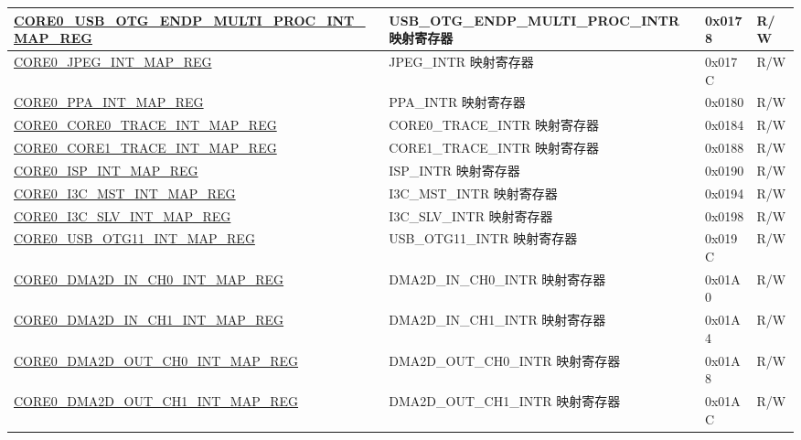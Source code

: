 \begin{longtable}{ | p{8.7cm} | p{6.2cm} | p{1.3cm} | p{1cm} | }
\hyperref[regdesc:CORE0USBOTGENDPMULTIPROCINTMAPREG]{CORE0\_USB\_OTG\_ENDP\_MULTI\_PROC\_INT\_MAP\_REG} & USB\_OTG\_ENDP\_MULTI\_PROC\_INTR 映射寄存器 & 0x0178 & R/W \\ \hline

\hyperref[regdesc:CORE0JPEGINTMAPREG]{CORE0\_JPEG\_INT\_MAP\_REG} & JPEG\_INTR 映射寄存器 & 0x017C & R/W \\ \hline

\hyperref[regdesc:CORE0PPAINTMAPREG]{CORE0\_PPA\_INT\_MAP\_REG} & PPA\_INTR 映射寄存器 & 0x0180 & R/W \\ \hline

\hyperref[regdesc:CORE0CORE0TRACEINTMAPREG]{CORE0\_CORE0\_TRACE\_INT\_MAP\_REG} & CORE0\_TRACE\_INTR 映射寄存器 & 0x0184 & R/W \\ \hline

\hyperref[regdesc:CORE0CORE1TRACEINTMAPREG]{CORE0\_CORE1\_TRACE\_INT\_MAP\_REG} & CORE1\_TRACE\_INTR 映射寄存器 & 0x0188 & R/W \\ \hline

\hyperref[regdesc:CORE0ISPINTMAPREG]{CORE0\_ISP\_INT\_MAP\_REG} & ISP\_INTR 映射寄存器 & 0x0190 & R/W \\ \hline

\hyperref[regdesc:CORE0I3CMSTINTMAPREG]{CORE0\_I3C\_MST\_INT\_MAP\_REG} & I3C\_MST\_INTR 映射寄存器 & 0x0194 & R/W \\ \hline

\hyperref[regdesc:CORE0I3CSLVINTMAPREG]{CORE0\_I3C\_SLV\_INT\_MAP\_REG} & I3C\_SLV\_INTR 映射寄存器 & 0x0198 & R/W \\ \hline

\hyperref[regdesc:CORE0USBOTG11INTMAPREG]{CORE0\_USB\_OTG11\_INT\_MAP\_REG} & USB\_OTG11\_INTR 映射寄存器 & 0x019C & R/W \\ \hline

\hyperref[regdesc:CORE0DMA2DINCH0INTMAPREG]{CORE0\_DMA2D\_IN\_CH0\_INT\_MAP\_REG} & DMA2D\_IN\_CH0\_INTR 映射寄存器 & 0x01A0 & R/W \\ \hline

\hyperref[regdesc:CORE0DMA2DINCH1INTMAPREG]{CORE0\_DMA2D\_IN\_CH1\_INT\_MAP\_REG} & DMA2D\_IN\_CH1\_INTR 映射寄存器 & 0x01A4 & R/W \\ \hline

\hyperref[regdesc:CORE0DMA2DOUTCH0INTMAPREG]{CORE0\_DMA2D\_OUT\_CH0\_INT\_MAP\_REG} & DMA2D\_OUT\_CH0\_INTR 映射寄存器 & 0x01A8 & R/W \\ \hline

\hyperref[regdesc:CORE0DMA2DOUTCH1INTMAPREG]{CORE0\_DMA2D\_OUT\_CH1\_INT\_MAP\_REG} & DMA2D\_OUT\_CH1\_INTR 映射寄存器 & 0x01AC & R/W \\ \hline


\end{longtable}
